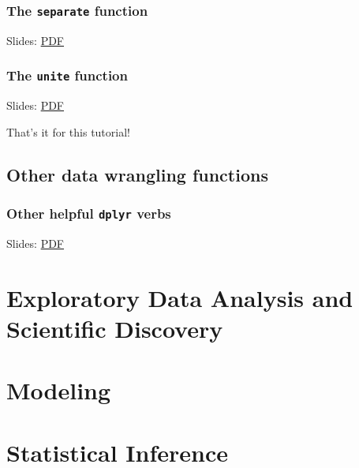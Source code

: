 \documentclass[
]{article}
\theoremstyle{definition}
\theoremstyle{definition}
\theoremstyle{definition}
\theoremstyle{definition}
\theoremstyle{remark}
\begin{document}
\hypertarget{the-separate-function}{%
\subsubsection{\texorpdfstring{The \texttt{separate} function}{The separate function}}\label{the-separate-function}}

Slides: \href{https://drive.google.com/file/d/17SOza86ASc-ioFA6_vmFeUj_HGWv_B7t}{PDF}

\hypertarget{the-unite-function}{%
\subsubsection{\texorpdfstring{The \texttt{unite} function}{The unite function}}\label{the-unite-function}}

Slides: \href{https://drive.google.com/file/d/1En-4bj2Vh74wdkPbdRmXSSS5K0UQNFGK}{PDF}

That's it for this tutorial!

\hypertarget{other-data-wrangling-functions}{%
\subsection{Other data wrangling functions}\label{other-data-wrangling-functions}}

\hypertarget{other-helpful-dplyr-verbs}{%
\subsubsection{\texorpdfstring{Other helpful \texttt{dplyr} verbs}{Other helpful dplyr verbs}}\label{other-helpful-dplyr-verbs}}

Slides: \href{https://drive.google.com/file/d/1mjcislhv3o_KUbTlSsw8pT6aar4uqSYZ}{PDF}

\newpage

\hypertarget{exploratory-data-analysis-and-scientific-discovery}{%
\section{Exploratory Data Analysis and Scientific Discovery}\label{exploratory-data-analysis-and-scientific-discovery}}

\hypertarget{modeling}{%
\section{Modeling}\label{modeling}}

\hypertarget{statistical-inference}{%
\section{Statistical Inference}\label{statistical-inference}}
\end{document}
